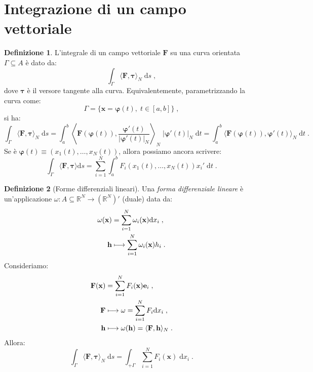 \documentclass[a4paper,12pt]{report}
\theoremstyle{plain}
\theoremstyle{definition}
\newtheorem{defn}{Definizione}[section]
\theoremstyle{remark}
\newcommand{\BF}[1]{\boldsymbol{#1}}
\newcommand{\diff}[1]{\mathrm{d}#1}
\numberwithin{equation}{section}
\begin{document}
\section{Integrazione di un campo vettoriale}
\begin{defn} L'integrale di un campo vettoriale $\mathbf{F}$ su una curva orientata $\Gamma\subseteq A$ è dato da:
\begin{equation}
\int_{\Gamma} \langle \mathbf{F},\boldsymbol{\tau}\rangle_N\;\diff{s}\;,
\end{equation}
dove $\boldsymbol{\tau}$ è il versore tangente alla curva. Equivalentemente, parametrizzando la curva come:
\begin{equation}
\Gamma=\{\mathbf{x}=\boldsymbol{\varphi}(t),\;t\in[a,b]\}\;,
\end{equation}
si ha:
\begin{equation}
\int_{\Gamma}\langle\mathbf{F},\boldsymbol{\tau}\rangle_N\;\diff{s}=\int_a^b\left\langle\mathbf{F}(\boldsymbol{\varphi}(t)),\frac{\boldsymbol{\varphi}'(t)}{|\boldsymbol{\varphi}'(t)|_N}\right\rangle_N\;|\boldsymbol{\varphi}'(t)|_N\;\diff{t}=\int_a^b \langle\mathbf{F}(\boldsymbol{\varphi}(t)),\boldsymbol{\varphi}'(t)\rangle_N\;\diff{t}\;.
\end{equation}
Se è $\boldsymbol{\varphi}(t)\equiv(x_1(t),\ldots,x_N(t))$, allora possiamo ancora scrivere:
\begin{equation}
\int_{\Gamma}\langle \mathbf{F},\BF{\tau}\rangle\diff{s}=\sum_{i=1}^N\int_a^b F_i(x_1(t),\ldots,x_N(t))x_i'\;\diff{t}\;.
\end{equation}
\end{defn}
\begin{defn}[Forme differenziali lineari] Una \textit{forma differenziale lineare} è un'applicazione $\omega:A\subseteq\mathbb{R}^N\to(\mathbb{R}^N)'$ (duale) data da:
\begin{align}
\omega(\mathbf{x})&=\sum_{i=1}^N \omega_i(\mathbf{x})\diff{x}_i\;, \notag \\
\mathbf{h} &\longmapsto \sum_{i=1}^N \omega_i(\mathbf{x})h_i\;.
\end{align}
Consideriamo:
\begin{align}
\mathbf{F}(\mathbf{x}) &=\sum_{i=1}^N F_i(\mathbf{x})\mathbf{e}_i\notag \;, \\
\mathbf{F} &\longmapsto \omega=\sum_{i=1}^N F_i\diff{x}_i\;, \notag \\
\mathbf{h} &\longmapsto \omega(\mathbf{h})=\langle \mathbf{F},\mathbf{h}\rangle_N\;.
\end{align}
Allora:
\begin{equation}
\int_{\Gamma} \langle\mathbf{F},\boldsymbol{\tau}\rangle_N\;\diff{s}=\int_{+\Gamma}\sum_{i=1}^N F_i(\mathbf{x})\;\diff{x}_i\;.
\end{equation}
\end{defn}
\end{document}
